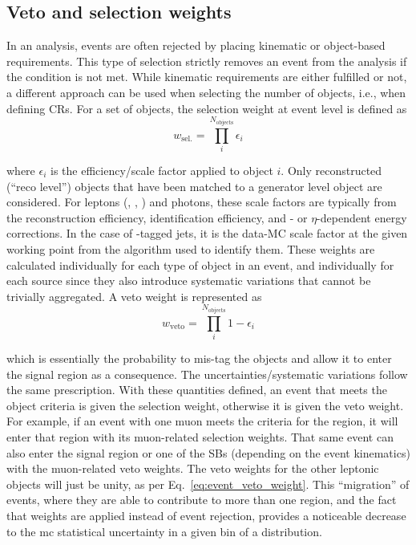 

\subsection{Veto and selection weights}
\label{subsec:veto_sel_weights}

In an analysis, events are often rejected by placing kinematic or object-based requirements. This type of selection strictly removes an event from the analysis if the condition is not met. While kinematic requirements are either fulfilled or not, a different approach can be used when selecting the number of objects, i.e., when defining \glspl{CR}. For a set of objects, the selection weight at event level is defined as
\begin{equation}
    w_{\mathrm{sel.}} = \prod_i^{N_\mathrm{objects}} \epsilon_i
    \label{eq:event_selection_weight}
\end{equation}

where $\epsilon_i$ is the efficiency/scale factor applied to object $i$. Only reconstructed (``reco level'') objects that have been matched to a generator level object are considered. For leptons (\Pe, \Pmu, \Ptau) and photons, these scale factors are typically from the reconstruction efficiency, identification efficiency, and \pt- or $\eta$-dependent energy corrections. In the case of \Pbottom-tagged \glspl{jet}, it is the data-MC scale factor at the given working point from the algorithm used to identify them. These weights are calculated individually for each type of object in an event, and individually for each source since they also introduce systematic variations that cannot be trivially aggregated. A veto weight is represented as
\begin{equation}
    w_{\mathrm{veto}} = \prod_i^{N_\mathrm{objects}} 1 - \epsilon_i
    \label{eq:event_veto_weight}
\end{equation}

which is essentially the probability to mis-tag the objects and allow it to enter the signal region as a consequence. The uncertainties/systematic variations follow the same prescription. With these quantities defined, an event that meets the object criteria is given the selection weight, otherwise it is given the veto weight. For example, if an event with one muon meets the criteria for the \singleMuCr region, it will enter that region with its muon-related selection weights. That same event can also enter the signal region or one of the \glspl{SB} (depending on the event kinematics) with the muon-related veto weights. The veto weights for the other leptonic objects will just be unity, as per Eq.~\ref{eq:event_veto_weight}. This ``migration'' of events, where they are able to contribute to more than one region, and the fact that weights are applied instead of event rejection, provides a noticeable decrease to the \acrlong{mc} statistical uncertainty in a given bin of a distribution.

